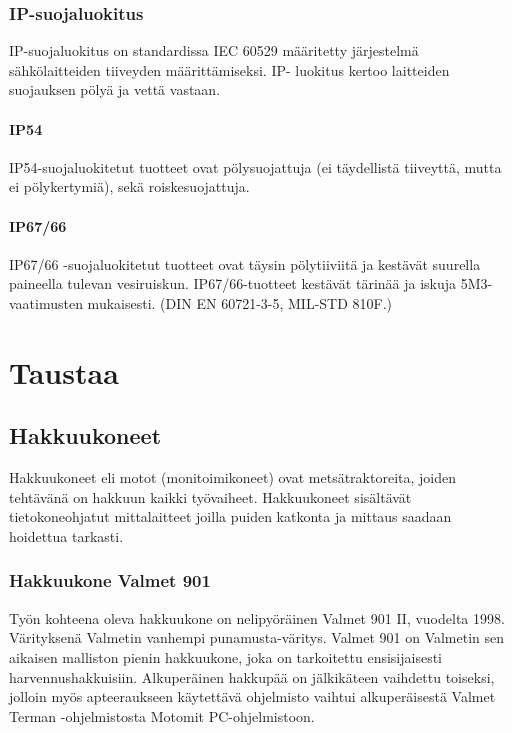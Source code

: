 \documentclass[11pt,a4paper,oneside,article]{memoir}
\begin{document}
\subsection{IP-suojaluokitus}

IP-suojaluokitus on standardissa IEC 60529 määritetty järjestelmä sähkölaitteiden tiiveyden määrittämiseksi. IP- luokitus kertoo laitteiden suojauksen pölyä ja vettä vastaan. \cite{IEC60529}

\subsubsection{IP54}

IP54-suojaluokitetut tuotteet ovat pölysuojattuja (ei täydellistä tiiveyttä, mutta ei pölykertymiä), sekä roiskesuojattuja.

\subsubsection{IP67/66}

IP67/66 -suojaluokitetut tuotteet ovat täysin pölytiiviitä ja kestävät suurella paineella tulevan vesiruiskun. IP67/66-tuotteet kestävät tärinää ja iskuja 5M3-vaatimusten mukaisesti. (DIN EN 60721-3-5, MIL-STD 810F.)

\newpage
\chapter{Taustaa}
\section{Hakkuukoneet}

Hakkuukoneet eli motot (monitoimikoneet) ovat metsätraktoreita, joiden tehtävänä on hakkuun kaikki työvaiheet. Hakkuukoneet sisältävät tietokoneohjatut mittalaitteet joilla puiden katkonta ja mittaus saadaan hoidettua tarkasti.

\subsection{Hakkuukone Valmet 901}

Työn kohteena oleva hakkuukone on nelipyöräinen Valmet 901 II, vuodelta 1998. Värityksenä Valmetin vanhempi punamusta-väritys. Valmet 901 on Valmetin sen aikaisen malliston pienin hakkuukone, joka on tarkoitettu ensisijaisesti harvennushakkuisiin. Alkuperäinen hakkupää on jälkikäteen vaihdettu toiseksi, jolloin myös apteeraukseen käytettävä ohjelmisto vaihtui alkuperäisestä Valmet Terman -ohjelmistosta Motomit PC-ohjelmistoon.
\end{document}
